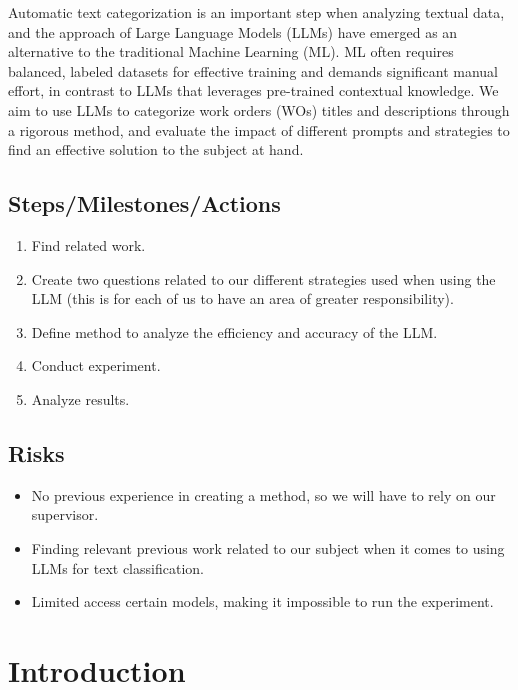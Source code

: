 \documentclass{article}
\begin{document}
Automatic text categorization is an important step when analyzing textual data,
and the approach of Large Language Models (LLMs) have emerged as an alternative
to the traditional Machine Learning (ML).
ML often requires balanced, labeled datasets for effective training
and demands significant manual effort, in contrast to LLMs that
leverages pre-trained contextual knowledge.
We aim to use LLMs to categorize work orders (WOs) titles and descriptions
through a rigorous method,
and evaluate the impact of different prompts and strategies to find
an effective solution to the subject at hand.

\subsection{Steps/Milestones/Actions}

\begin{enumerate}
      \item Find related work.
      \item Create two questions related to our different strategies used
            when using the LLM (this is for each of us to have an area of
            greater responsibility).
      \item Define method to analyze the efficiency and accuracy of the LLM.
      \item Conduct experiment.
      \item Analyze results.
\end{enumerate}

\subsection{Risks}

\begin{itemize}
      \item No previous experience in creating a method, so we will have to rely on our
            supervisor.
      \item Finding relevant previous work related to our subject when it comes to using LLMs
            for text classification.
      \item Limited access certain models, making it impossible to run the experiment.
\end{itemize}

\section{Introduction}
\end{document}
